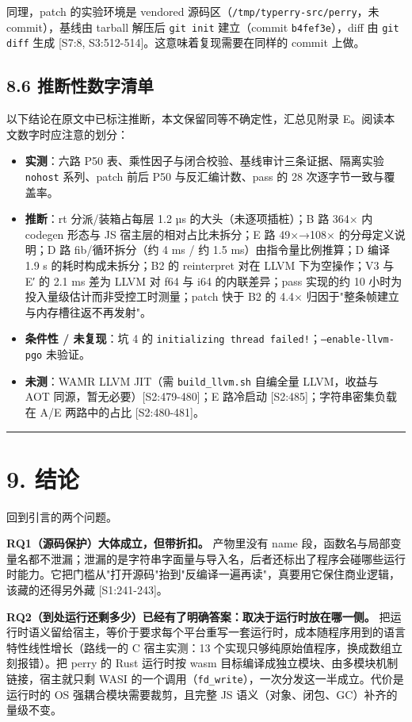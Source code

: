 \documentclass[11pt, a4paper]{article}
\begin{document}
同理，patch 的实验环境是 vendored 源码区（\texttt{/tmp/typerry-src/perry}，未 commit），基线由 tarball 解压后 \texttt{git init} 建立（commit \texttt{b4fef3e}），diff 由 \texttt{git diff} 生成 [S7:8, S3:512-514]。这意味着复现需要在同样的 commit 上做。


\subsection{8.6 推断性数字清单}

以下结论在原文中已标注推断，本文保留同等不确定性，汇总见附录 E。阅读本文数字时应注意的划分：


\begin{itemize}
\item \textbf{实测}：六路 P50 表、乘性因子与闭合校验、基线审计三条证据、隔离实验 \texttt{nohost} 系列、patch 前后 P50 与反汇编计数、pass 的 28 次逐字节一致与覆盖率。
\item \textbf{推断}：rt 分派/装箱占每层 1.2 µs 的大头（未逐项插桩）；B 路 364× 内 codegen 形态与 JS 宿主层的相对占比未拆分；E 路 49×→108× 的分母定义说明；D 路 fib/循环拆分（约 4 ms / 约 1.5 ms）由指令量比例推算；D 编译 1.9 s 的耗时构成未拆分；B2 的 reinterpret 对在 LLVM 下为空操作；V3 与 E′ 的 2.1 ms 差为 LLVM 对 f64 与 i64 的内联差异；pass 实现的约 10 小时为投入量级估计而非受控工时测量；patch 快于 B2 的 4.4× 归因于"整条帧建立与内存槽往返不再发射"。
\item \textbf{条件性 / 未复现}：坑 4 的 \texttt{initializing thread failed!}；\texttt{--enable-llvm-pgo} 未验证。
\item \textbf{未测}：WAMR LLVM JIT（需 \texttt{build\_llvm.sh} 自编全量 LLVM，收益与 AOT 同源，暂无必要）[S2:479-480]；E 路冷启动 [S2:485]；字符串密集负载在 A/E 两路中的占比 [S2:480-481]。
\end{itemize}

\bigskip\hrule\bigskip

\section{9. 结论}

回到引言的两个问题。


\textbf{RQ1（源码保护）大体成立，但带折扣。} 产物里没有 name 段，函数名与局部变量名都不泄漏；泄漏的是字符串字面量与导入名，后者还标出了程序会碰哪些运行时能力。它把门槛从"打开源码"抬到"反编译一遍再读"，真要用它保住商业逻辑，该藏的还得另外藏 [S1:241-243]。


\textbf{RQ2（到处运行还剩多少）已经有了明确答案：取决于运行时放在哪一侧。} 把运行时语义留给宿主，等价于要求每个平台重写一套运行时，成本随程序用到的语言特性线性增长（路线一的 C 宿主实测：13 个实现只够纯原始值程序，换成数组立刻报错）。把 perry 的 Rust 运行时按 wasm 目标编译成独立模块、由多模块机制链接，宿主就只剩 WASI 的一个调用（\texttt{fd\_write}），一次分发这一半成立。代价是运行时的 OS 强耦合模块需要裁剪，且完整 JS 语义（对象、闭包、GC）补齐的量级不变。
\end{document}
